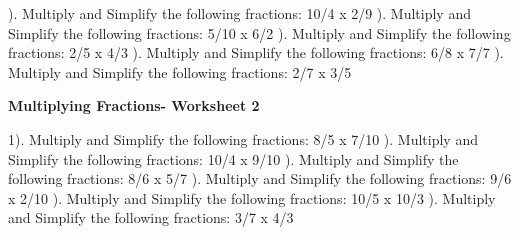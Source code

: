 \documentclass{article}%
\begin{document}
). Multiply and Simplify the following fractions: 10/4 x 2/9%
\newline%
\newline%
). Multiply and Simplify the following fractions: 5/10 x 6/2%
\newline%
\newline%
). Multiply and Simplify the following fractions: 2/5 x 4/3%
\newline%
\newline%
). Multiply and Simplify the following fractions: 6/8 x 7/7%
\newline%
\newline%
). Multiply and Simplify the following fractions: 2/7 x 3/5%
\newline%
\newline%
\newline%
\pagebreak%
\large%
\begin{center}%
\textbf{Multiplying Fractions- Worksheet 2}%
\newline%
\end{center} \normalsize%
1). Multiply and Simplify the following fractions: 8/5 x 7/10%
\newline%
\newline%
). Multiply and Simplify the following fractions: 10/4 x 9/10%
\newline%
\newline%
). Multiply and Simplify the following fractions: 8/6 x 5/7%
\newline%
\newline%
). Multiply and Simplify the following fractions: 9/6 x 2/10%
\newline%
\newline%
). Multiply and Simplify the following fractions: 10/5 x 10/3%
\newline%
\newline%
). Multiply and Simplify the following fractions: 3/7 x 4/3%
\newline%
\newline%
\newline%
\end{document}
